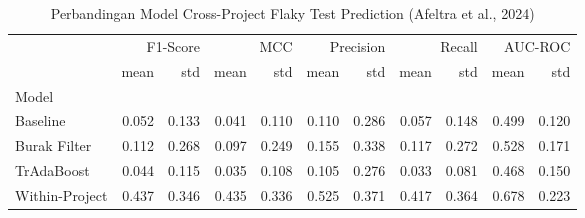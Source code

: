 \begin{table}
\caption{Perbandingan Model Cross-Project Flaky Test Prediction (Afeltra et al., 2024)}
\label{tab:cross_project_results}
\begin{tabular}{lrrrrrrrrrr}
\toprule
 & \multicolumn{2}{r}{F1-Score} & \multicolumn{2}{r}{MCC} & \multicolumn{2}{r}{Precision} & \multicolumn{2}{r}{Recall} & \multicolumn{2}{r}{AUC-ROC} \\
 & mean & std & mean & std & mean & std & mean & std & mean & std \\
Model &  &  &  &  &  &  &  &  &  &  \\
\midrule
Baseline & 0.052 & 0.133 & 0.041 & 0.110 & 0.110 & 0.286 & 0.057 & 0.148 & 0.499 & 0.120 \\
Burak Filter & 0.112 & 0.268 & 0.097 & 0.249 & 0.155 & 0.338 & 0.117 & 0.272 & 0.528 & 0.171 \\
TrAdaBoost & 0.044 & 0.115 & 0.035 & 0.108 & 0.105 & 0.276 & 0.033 & 0.081 & 0.468 & 0.150 \\
Within-Project & 0.437 & 0.346 & 0.435 & 0.336 & 0.525 & 0.371 & 0.417 & 0.364 & 0.678 & 0.223 \\
\bottomrule
\end{tabular}
\end{table}
